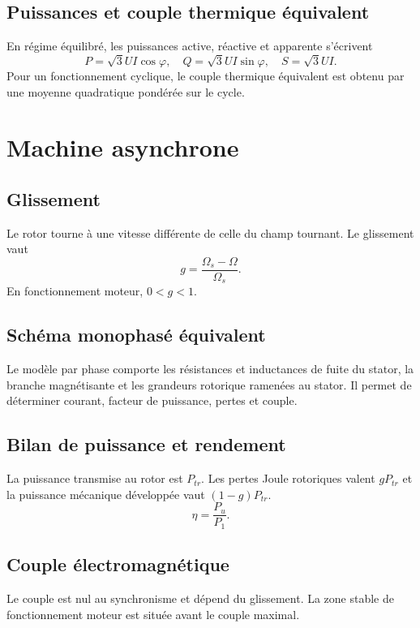 \subsection{Puissances et couple thermique équivalent}
En régime équilibré, les puissances active, réactive et apparente s'écrivent
\[
P=\sqrt3 UI\cos\varphi,\quad Q=\sqrt3 UI\sin\varphi,\quad S=\sqrt3 UI.
\]
Pour un fonctionnement cyclique, le couple thermique équivalent est obtenu par une moyenne quadratique pondérée sur le cycle.

\section{Machine asynchrone}
\subsection{Glissement}
Le rotor tourne à une vitesse différente de celle du champ tournant. Le glissement vaut
\[
g=\frac{\Omega_s-\Omega}{\Omega_s}.
\]
En fonctionnement moteur, $0<g<1$.

\subsection{Schéma monophasé équivalent}
Le modèle par phase comporte les résistances et inductances de fuite du stator, la branche magnétisante et les grandeurs rotorique ramenées au stator. Il permet de déterminer courant, facteur de puissance, pertes et couple.

\subsection{Bilan de puissance et rendement}
\begin{center}\TLBilanPuissanceMAS\end{center}
La puissance transmise au rotor est $P_{tr}$. Les pertes Joule rotoriques valent $gP_{tr}$ et la puissance mécanique développée vaut $(1-g)P_{tr}$.
\[
\eta=\frac{P_u}{P_1}.
\]

\subsection{Couple électromagnétique}
\begin{center}\TLCoupleGlissementMAS\end{center}
Le couple est nul au synchronisme et dépend du glissement. La zone stable de fonctionnement moteur est située avant le couple maximal.

